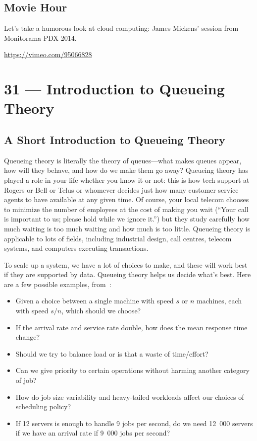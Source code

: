 \documentclass[a4paper]{report}
\begin{document}
\section*{Movie Hour}
Let's take a humorous look at cloud computing: James Mickens' session from Monitorama PDX 2014. 

\begin{center}
\url{https://vimeo.com/95066828}
\end{center}









\chapter*{31 --- Introduction to Queueing Theory}


\section*{A Short Introduction to Queueing Theory}

Queueing theory is literally the theory of queues---what makes queues appear, how will they behave, and how do we make them go away? Queueing theory has played a role in your life whether you know it or not: this is how tech support at Rogers or Bell or Telus or whomever decides just how many customer service agents to have available at any given time. Of course, your local telecom chooses to minimize the number of employees at the cost of making you wait (``Your call is important to us; please hold while we ignore it.'') but they study carefully how much waiting is too much waiting and how much is too little. Queueing theory is applicable to lots of fields, including industrial design, call centres, telecom systems, and computers executing transactions. 

To scale up a system, we have a lot of choices to make, and these will work best if they are supported by data. Queueing theory helps us decide what's best. Here are a few possible examples, from~\cite{pmd}:

\begin{itemize}
 \item Given a choice between a single machine with speed $s$ or $n$ machines, each with speed $s/n$, which should we choose?
 \item If the arrival rate and service rate double, how does the mean response time change?
 \item Should we try to balance load or is that a waste of time/effort?
 \item Can we give priority to certain operations without harming another category of job?
 \item How do job size variability and heavy-tailed workloads affect our choices of scheduling policy?
 \item If 12 servers is enough to handle 9 jobs per second, do we need 12~000 servers if we have an arrival rate if 9~000 jobs per second?
\end{itemize}
\end{document}
